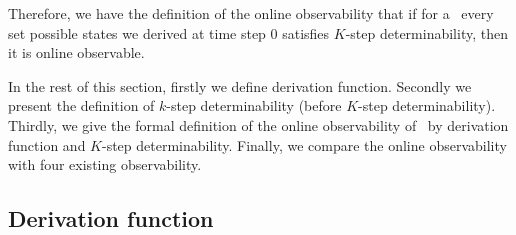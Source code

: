 Therefore, we have the definition of the online observability that if for a \BCN\ every set possible states we derived at time step $0$ satisfies $K$-step determinability, then it is online observable.

 In the rest of this section, firstly we define derivation function. Secondly we present the definition of $k$-step determinability (before $K$-step determinability). Thirdly, we give the formal definition of the online observability of \BCNs\ by derivation function and $K$-step determinability. Finally, we compare the online observability with four existing observability.
\subsection{Derivation function}

